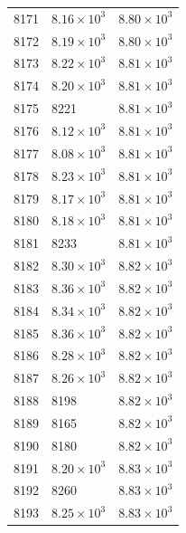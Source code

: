 \begin{table}[H]
\begin{tabular}{lll}
8171 & $\displaystyle 8.16 \times 10^{3}$ & $\displaystyle 8.80 \times 10^{3}$ \\
8172 & $\displaystyle 8.19 \times 10^{3}$ & $\displaystyle 8.80 \times 10^{3}$ \\
8173 & $\displaystyle 8.22 \times 10^{3}$ & $\displaystyle 8.81 \times 10^{3}$ \\
8174 & $\displaystyle 8.20 \times 10^{3}$ & $\displaystyle 8.81 \times 10^{3}$ \\
8175 & 8221 & $\displaystyle 8.81 \times 10^{3}$ \\
8176 & $\displaystyle 8.12 \times 10^{3}$ & $\displaystyle 8.81 \times 10^{3}$ \\
8177 & $\displaystyle 8.08 \times 10^{3}$ & $\displaystyle 8.81 \times 10^{3}$ \\
8178 & $\displaystyle 8.23 \times 10^{3}$ & $\displaystyle 8.81 \times 10^{3}$ \\
8179 & $\displaystyle 8.17 \times 10^{3}$ & $\displaystyle 8.81 \times 10^{3}$ \\
8180 & $\displaystyle 8.18 \times 10^{3}$ & $\displaystyle 8.81 \times 10^{3}$ \\
8181 & 8233 & $\displaystyle 8.81 \times 10^{3}$ \\
8182 & $\displaystyle 8.30 \times 10^{3}$ & $\displaystyle 8.82 \times 10^{3}$ \\
8183 & $\displaystyle 8.36 \times 10^{3}$ & $\displaystyle 8.82 \times 10^{3}$ \\
8184 & $\displaystyle 8.34 \times 10^{3}$ & $\displaystyle 8.82 \times 10^{3}$ \\
8185 & $\displaystyle 8.36 \times 10^{3}$ & $\displaystyle 8.82 \times 10^{3}$ \\
8186 & $\displaystyle 8.28 \times 10^{3}$ & $\displaystyle 8.82 \times 10^{3}$ \\
8187 & $\displaystyle 8.26 \times 10^{3}$ & $\displaystyle 8.82 \times 10^{3}$ \\
8188 & 8198 & $\displaystyle 8.82 \times 10^{3}$ \\
8189 & 8165 & $\displaystyle 8.82 \times 10^{3}$ \\
8190 & 8180 & $\displaystyle 8.82 \times 10^{3}$ \\
8191 & $\displaystyle 8.20 \times 10^{3}$ & $\displaystyle 8.83 \times 10^{3}$ \\
8192 & 8260 & $\displaystyle 8.83 \times 10^{3}$ \\
8193 & $\displaystyle 8.25 \times 10^{3}$ & $\displaystyle 8.83 \times 10^{3}$ \\

\end{tabular}
\end{table}
